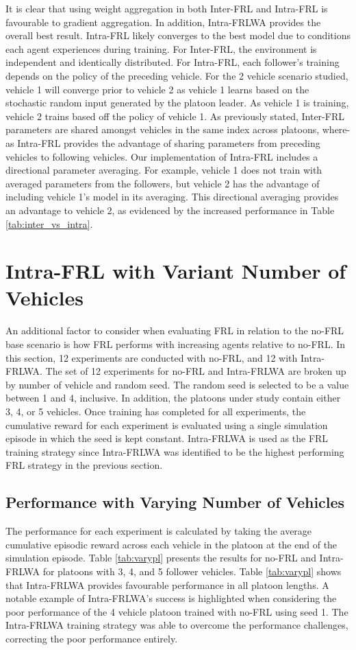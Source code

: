 It is clear that using weight aggregation in both Inter-FRL and Intra-FRL is favourable
to gradient aggregation.  In addition, Intra-FRLWA provides the overall best result.
Intra-FRL likely converges to the best model due to conditions each agent experiences
during training.  For Inter-FRL, the environment is independent and identically
distributed. For Intra-FRL, each follower's training depends on the policy of the
preceding vehicle.  For the 2 vehicle scenario studied, vehicle 1 will converge prior
to vehicle 2 as vehicle 1 learns based on the stochastic random input generated by
the platoon leader. As vehicle 1 is training, vehicle 2 trains based off the policy
of vehicle 1. As previously stated, Inter-FRL parameters are shared amongst vehicles
in the same index across platoons, where-as Intra-FRL provides the advantage of
sharing parameters from preceding vehicles to following vehicles. Our implementation
of Intra-FRL includes a directional parameter averaging.  For example, vehicle 1 does
not train with averaged parameters from the followers, but vehicle 2 has the advantage
of including vehicle 1's model in its averaging.  This directional averaging provides
an advantage to vehicle 2, as evidenced by the increased performance in Table
\ref{tab:inter_vs_intra}.

\section{Intra-FRL with Variant Number of Vehicles}
An additional factor to consider when evaluating FRL in relation to the no-FRL base
scenario is how FRL performs with increasing agents relative to no-FRL.  In this section,
12 experiments are conducted with no-FRL, and 12 with Intra-FRLWA. The set of 12
experiments for no-FRL and Intra-FRLWA are broken up by number of vehicle and random
seed.  The random seed is selected to be a value between 1 and 4, inclusive. In addition,
the platoons under study contain either 3, 4, or 5 vehicles. Once training has completed
for all experiments, the cumulative reward for each experiment is evaluated using a single
simulation episode in which the seed is kept constant.  Intra-FRLWA is used as the FRL
training strategy since Intra-FRLWA was identified to be the highest performing FRL
strategy in the previous section.

\subsection{Performance with Varying Number of Vehicles}
The performance for each experiment is calculated by taking the average cumulative episodic
reward across each vehicle in the platoon at the end of the simulation episode.  Table
\ref{tab:varypl} presents the results for no-FRL and Intra-FRLWA for platoons with 3, 4,
and 5 follower vehicles. Table \ref{tab:varypl} shows that Intra-FRLWA provides
favourable performance in all platoon lengths. A notable example of Intra-FRLWA's success
is highlighted when considering the poor performance of the 4 vehicle platoon trained with
no-FRL using seed 1. The Intra-FRLWA training strategy was able to overcome the performance
challenges, correcting the poor performance entirely.

